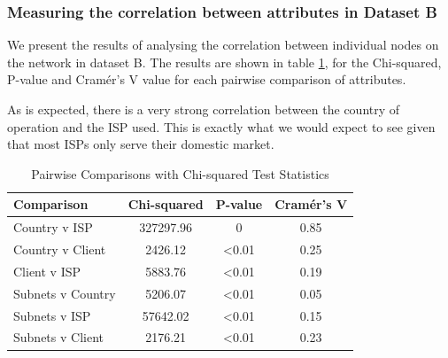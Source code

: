 \documentclass[conference]{IEEEtran}
\begin{document}
\subsubsection{Measuring the correlation between attributes in Dataset B}

We present the results of analysing the correlation between individual nodes on the network in dataset B. The results are shown in table \ref{tab:pairwise-comparisons-dataset-b}, for the Chi-squared, P-value and Cramér's V value for each pairwise comparison of attributes.

As is expected, there is a very strong correlation between the country of operation and the ISP used.  This is exactly what we would expect to see given that most ISPs only serve their domestic market.

\vspace{10pt}


\begin{table}[ht]
    \centering
    \renewcommand{\arraystretch}{1.5}
    \begin{tabular}{|p{2.5cm}|c|c|c|}
        \hline
        \textbf{Comparison} & \textbf{Chi-squared} & \textbf{P-value} & \textbf{Cramér's V} \\
        \hline
        Country v ISP & 327297.96 & 0 & 0.85 \\ \hline
        Country v Client & 2426.12 & \textless 0.01 & 0.25 \\ \hline
        Client v ISP & 5883.76 & \textless 0.01 & 0.19 \\ \hline
        Subnets v Country & 5206.07 & \textless 0.01 & 0.05 \\ \hline
        Subnets v ISP & 57642.02 & \textless 0.01 & 0.15 \\ \hline
        Subnets v Client & 2176.21 & \textless 0.01 & 0.23 \\ \hline
    \end{tabular}
    \vspace{10pt}
    \caption{Pairwise Comparisons with Chi-squared Test Statistics}
    \label{tab:pairwise-comparisons-dataset-b}
\end{table}
\end{document}
